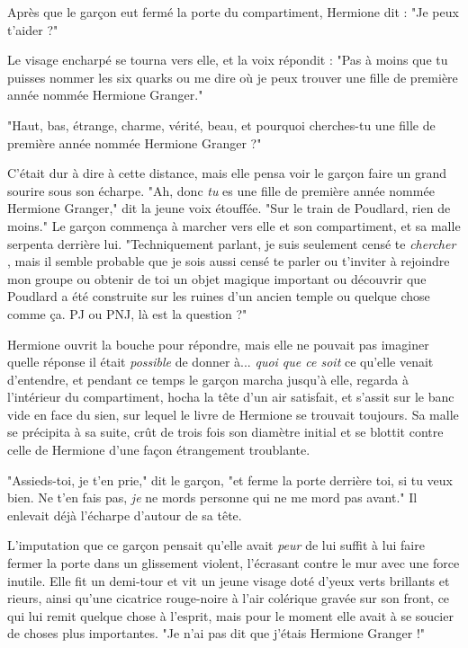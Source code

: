 Après que le garçon eut fermé la porte du compartiment, Hermione dit : "Je peux t'aider ?"

Le visage encharpé se tourna vers elle, et la voix répondit : "Pas à moins que tu puisses nommer les six quarks ou me dire où je peux trouver une fille de première année nommée Hermione Granger."

"Haut, bas, étrange, charme, vérité, beau, et pourquoi cherches-tu une fille de première année nommée Hermione Granger ?"

C'était dur à dire à cette distance, mais elle pensa voir le garçon faire un grand sourire sous son écharpe. "Ah, donc \emph{tu } es une fille de première année nommée Hermione Granger," dit la jeune voix étouffée. "Sur le train de Poudlard, rien de moins." Le garçon commença à marcher vers elle et son compartiment, et sa malle serpenta derrière lui. "Techniquement parlant, je suis seulement censé te \emph{chercher} , mais il semble probable que je sois aussi censé te parler ou t'inviter à rejoindre mon groupe ou obtenir de toi un objet magique important ou découvrir que Poudlard a été construite sur les ruines d'un ancien temple ou quelque chose comme ça. PJ ou PNJ, là est la question ?"

Hermione ouvrit la bouche pour répondre, mais elle ne pouvait pas imaginer quelle réponse il était \emph{possible}  de donner à... \emph{quoi que ce soit}  ce qu'elle venait d'entendre, et pendant ce temps le garçon marcha jusqu'à elle, regarda à l'intérieur du compartiment, hocha la tête d'un air satisfait, et s'assit sur le banc vide en face du sien, sur lequel le livre de Hermione se trouvait toujours. Sa malle se précipita à sa suite, crût de trois fois son diamètre initial et se blottit contre celle de Hermione d'une façon étrangement troublante.

"Assieds-toi, je t'en prie," dit le garçon, "et ferme la porte derrière toi, si tu veux bien. Ne t'en fais pas, \emph{je}  ne mords personne qui ne me mord pas avant." Il enlevait déjà l'écharpe d'autour de sa tête.

L'imputation que ce garçon pensait qu'elle avait \emph{peur}  de lui suffit à lui faire fermer la porte dans un glissement violent, l'écrasant contre le mur avec une force inutile. Elle fit un demi-tour et vit un jeune visage doté d'yeux verts brillants et rieurs, ainsi qu'une cicatrice rouge-noire à l'air colérique gravée sur son front, ce qui lui remit quelque chose à l'esprit, mais pour le moment elle avait à se soucier de choses plus importantes. "Je n'ai pas dit que j'étais Hermione Granger !"

